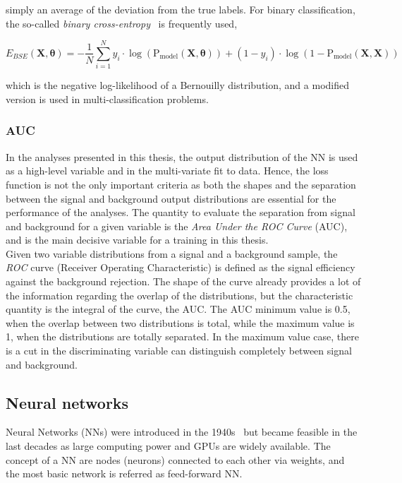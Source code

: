 simply an average of the deviation from the true labels. For binary classification, the so-called \textit{binary cross-entropy}~\cite{binarycross} is frequently used, 

\begin{equation}
    E_{BSE}(\mathbf{X},\boldsymbol{\theta}) = -\frac{1}{N}\sum_{i=1}^N y_i\cdot\log(\text{P}_\text{model}(\mathbf{X},\boldsymbol{\theta}))+(1-y_i)\cdot\log(1-\text{P}_\text{model}(\mathbf{X},\mathbf{X}))
\end{equation}

which is the negative log-likelihood of a Bernouilly distribution, and a modified version is used in multi-classification problems. 

\subsubsection{AUC}

In the analyses presented in this thesis, the output distribution of the NN is used as a high-level variable and in the  multi-variate fit to data. Hence, the loss function is not the only important criteria as both the shapes and the separation between the signal and background output distributions are essential for the performance of the analyses. The quantity to evaluate the separation from signal and background for a given variable is the \textit{Area Under the ROC Curve} (AUC), and is the main decisive variable for a training in this thesis.\\

Given two variable distributions from a signal and a background sample, the \textit{ROC} curve (Receiver Operating Characteristic) is defined as the signal efficiency against the background rejection.%
The shape of the curve already provides a lot of the information regarding the overlap of the distributions, but the characteristic quantity is the integral of the curve, the AUC. The AUC minimum value is 0.5, when the overlap between two distributions is total, while the maximum value is 1, when the distributions are totally separated. In the maximum value case, there is a cut in the discriminating variable can distinguish completely between signal and background.

\subsection{Neural networks}
\label{ML:SectionNN}
Neural Networks (NNs) were introduced in the 1940s~\cite{McCulloch1943} but became feasible in the last decades as large computing power and GPUs are widely available. The concept of a NN are nodes (neurons) connected to each other via weights, and the most basic network is referred as feed-forward NN.\\

